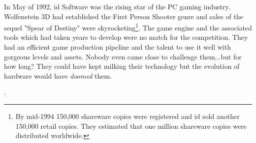 In May of 1992, id Software was the rising star of the PC gaming industry. Wolfenstein 3D had established the First
Person Shooter genre and sales of the sequel "Spear of Destiny" were skyrocketing\footnote{By mid-1994 150,000 shareware copies were registered and id sold another 150,000 retail copies. They estimated that one million shareware copies were distributed worldwide.}. The game engine and the associated 
tools which had taken years to develop were no match for the competition. They had an efficient game production pipeline and the talent to use it well with gorgeous levels and assets. Nobody even came close to challenge them...but for how long? They could have kept milking their technology but the evolution of hardware would have \textit{doomed} them.\\
\par

\par
{}. \\
\par



